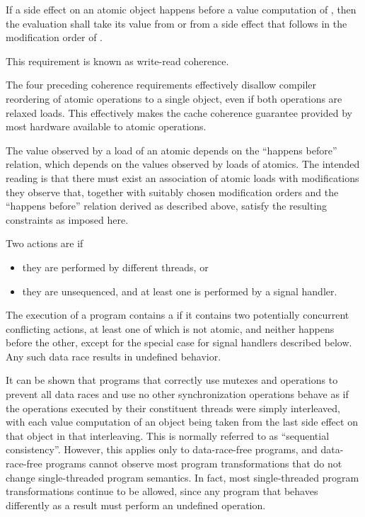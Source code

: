 \pnum
If a
%
side effect  on an atomic object  happens before a value
computation  of , then the evaluation  shall take its
value from  or from a
%
side effect  that follows  in the
modification order of . \begin{note} This requirement is known as
write-read coherence. \end{note}

\pnum
\begin{note} The four preceding coherence requirements effectively disallow
compiler reordering of atomic operations to a single object, even if both
operations are relaxed loads. This effectively makes the cache coherence
guarantee provided by most hardware available to \Cpp atomic operations.
\end{note}

\pnum
\begin{note} The value observed by a load of an atomic depends on the ``happens
before'' relation, which depends on the values observed by loads of atomics.
The intended reading is that there must exist an
association of atomic loads with modifications they observe that, together with
suitably chosen modification orders and the ``happens before'' relation derived
as described above, satisfy the resulting constraints as imposed here. \end{note}

\pnum
{}%
Two actions are  if
\begin{itemize}
\item they are performed by different threads, or
\item they are unsequenced, and at least one is performed by a signal handler.
\end{itemize}
%
The execution of a program contains a  if it contains two
potentially concurrent conflicting actions, at least one of which is not atomic,
and neither happens before the other,
except for the special case for signal handlers described below.
Any such data race results in undefined
behavior. \begin{note} It can be shown that programs that correctly use mutexes
and  operations to prevent all data races and use no
other synchronization operations behave as if the operations executed by their
constituent threads were simply interleaved, with each
%
value computation of an
object being taken from the last
%
side effect on that object in that
interleaving. This is normally referred to as ``sequential consistency''.
However, this applies only to data-race-free programs, and data-race-free
programs cannot observe most program transformations that do not change
single-threaded program semantics. In fact, most single-threaded program
transformations continue to be allowed, since any program that behaves
differently as a result must perform an undefined operation. \end{note}

